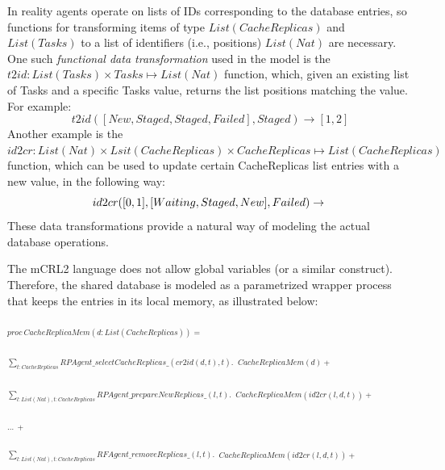 \documentclass[10pt,conference]{IEEEtran}
\begin{document}
In reality agents operate on lists of IDs corresponding to the database
entries, so functions for transforming items of type \begin{math}List(CacheReplicas)\end{math}
and \begin{math}List(Tasks)\end{math}
to a list of identifiers (i.e., positions) 
\begin{math}List(Nat)\end{math} are necessary.
One such \textit{functional data transformation} used in the model is the 
$t2id:List(Tasks)\times Tasks\mapsto List(Nat)$ function, which,
given an existing list of Tasks and a specific Tasks value, returns the list positions
 matching the value.
For example:
\begin{displaymath}
t2id([New,Staged,Staged,Failed],Staged)\rightarrow [1,2] 
\end{displaymath}
Another example is the 
$id2cr:List(Nat)\times Lsit(CacheReplicas)\times CacheReplicas\mapsto List(CacheReplicas)$                                                                                                
function, which can be used to update certain CacheReplicas list entries with a new value, in the following way:
\begin{displaymath}
id2cr([0,1],[Waiting,Staged,New],Failed) \\
 \rightarrow \\
\end{displaymath}
\begin{displaymath}
[Failed,Failed,New]
\end{displaymath}
These data transformations provide a natural way of modeling
the actual database operations.

The mCRL2 language does not allow global variables (or a similar construct).
Therefore, the shared database is modeled as a parametrized wrapper process
that keeps the entries in its local memory, as illustrated below:

$_{proc\ CacheReplicaMem(d:List(CacheReplicas)) = }$

$_{\sum_{t:CacheReplicas} RPAgent\_selectCacheReplicas\_(cr2id(d,t),t). } $
$_{CacheReplicaMem(d) +}$

$_{\sum_{l:List(Nat),t:CacheReplicas} RPAgent\_prepareNewReplicas\_(l,t).}$
$_{CacheReplicaMem(id2cr(l,d,t))+}$

$_{\dots\ +}$ 

$_{\sum_{l:List(Nat),t:CacheReplicas} RFAgent\_removeReplicas\_(l,t).}$
$_{CacheReplicaMem(id2cr(l,d,t))+}$
\end{document}
